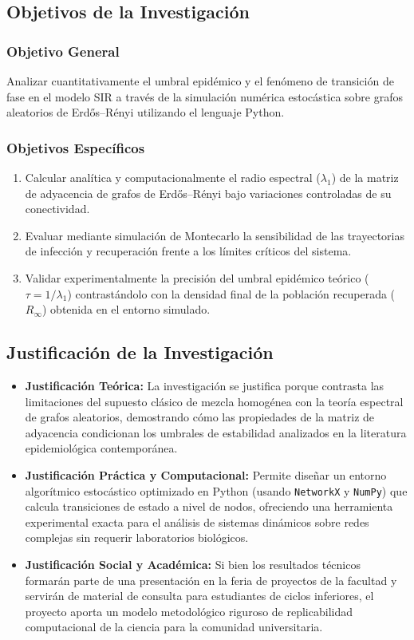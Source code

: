 \documentclass[12pt]{article}
\begin{document}
\subsection{Objetivos de la Investigación}

\subsubsection{Objetivo General}
Analizar cuantitativamente el umbral epidémico y el fenómeno de transición de fase en el modelo SIR a través de la simulación numérica estocástica sobre grafos aleatorios de Erdős–Rényi utilizando el lenguaje Python.

\subsubsection{Objetivos Específicos}
\begin{enumerate}
    \item Calcular analítica y computacionalmente el radio espectral ($\lambda_1$) de la matriz de adyacencia de grafos de Erdős–Rényi bajo variaciones controladas de su conectividad.
    \item Evaluar mediante simulación de Montecarlo la sensibilidad de las trayectorias de infección y recuperación frente a los límites críticos del sistema.
    \item Validar experimentalmente la precisión del umbral epidémico teórico ($\tau = 1/\lambda_1$) contrastándolo con la densidad final de la población recuperada ($R_\infty$) obtenida en el entorno simulado.
\end{enumerate}

\subsection{Justificación de la Investigación}
\begin{itemize}
    \item \textbf{Justificación Teórica:} La investigación se justifica porque contrasta las limitaciones del supuesto clásico de mezcla homogénea con la teoría espectral de grafos aleatorios, demostrando cómo las propiedades de la matriz de adyacencia condicionan los umbrales de estabilidad analizados en la literatura epidemiológica contemporánea.
    \item \textbf{Justificación Práctica y Computacional:} Permite diseñar un entorno algorítmico estocástico optimizado en Python (usando \texttt{NetworkX} y \texttt{NumPy}) que calcula transiciones de estado a nivel de nodos, ofreciendo una herramienta experimental exacta para el análisis de sistemas dinámicos sobre redes complejas sin requerir laboratorios biológicos.
    \item \textbf{Justificación Social y Académica:} Si bien los resultados técnicos formarán parte de una presentación en la feria de proyectos de la facultad y servirán de material de consulta para estudiantes de ciclos inferiores, el proyecto aporta un modelo metodológico riguroso de replicabilidad computacional de la ciencia para la comunidad universitaria.
\end{itemize}
\newpage
\end{document}
